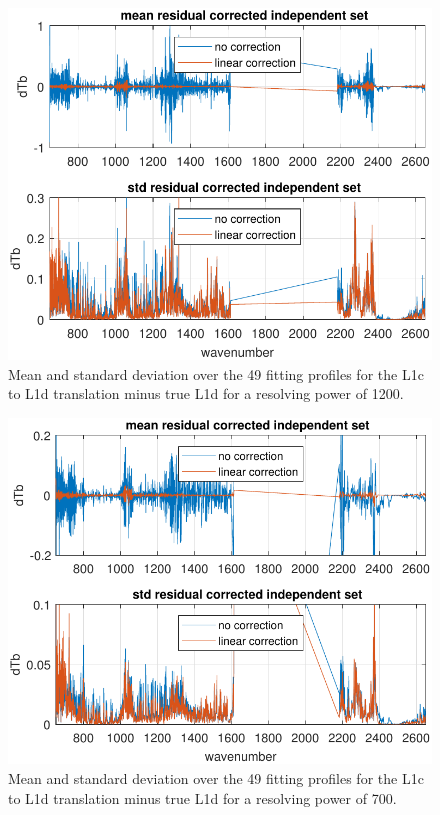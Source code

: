 \documentclass[journal]{IEEEtran}
\begin{document}
\begin{figure} %
  \centering
  \includegraphics[width=\linewidth]{figures/L1d_cor1_1200.pdf}
  \caption{Mean and standard deviation over the 49 fitting profiles
    for the L1c to L1d translation minus true L1d for a resolving
    power of 1200.}
  \label{L1d1200}
\end{figure}

\begin{figure} %
  \centering
  \includegraphics[width=\linewidth]{figures/L1d_cor1_700.pdf}
  \caption{Mean and standard deviation over the 49 fitting profiles
    for the L1c to L1d translation minus true L1d for a resolving
    power of 700.}
  \label{L1d700s}
\end{figure}
\end{document}

